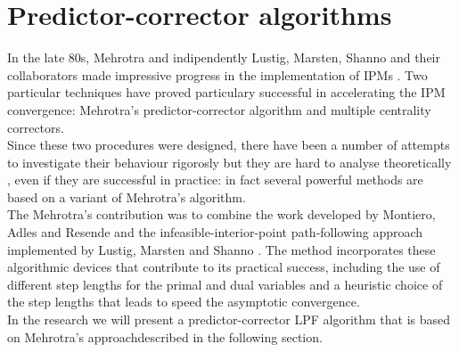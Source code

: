 \documentclass[a4paper,10 pt,titlepage,twoside]{book}
\theoremstyle{plain}
\theoremstyle{definition}
\theoremstyle{remark}
\begin{document}
\section{Predictor-corrector algorithms}\label{sec:pc}
In the late 80s, Mehrotra and indipendently Lustig, Marsten, Shanno and their collaborators made impressive progress in the implementation of IPMs \cite{Mehr}. Two particular techniques have proved particulary successful in accelerating the IPM convergence: Mehrotra's predictor-corrector algorithm and multiple centrality correctors. \\Since these two procedures were designed, there have been a number of attempts to investigate their behaviour rigorosly but they are hard to analyse theoretically \cite{25y}, even if they are successful in practice: in fact several powerful methods are based on a variant of Mehrotra's algorithm.\\
The Mehrotra's contribution was to combine the work developed by Montiero, Adles and Resende \cite{MARE} and the infeasible-interior-point path-following approach implemented by Lustig, Marsten and Shanno \cite{LMS}. 
The method incorporates these algorithmic devices that contribute to its practical success, including the use of different step lengths for the primal and dual variables and a heuristic choice of the step lengths that leads to speed the asymptotic convergence.\\In the research we will present a predictor-corrector LPF algorithm that is based on Mehrotra's approachdescribed in the following section. 
\end{document}
